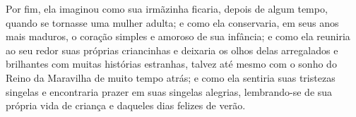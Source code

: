 Por fim, ela imaginou como sua irmãzinha ficaria, depois de algum tempo,
quando se tornasse uma mulher adulta; e como ela conservaria, em seus
anos mais maduros, o coração simples e amoroso de sua infância; e como
ela reuniria ao seu redor suas próprias criancinhas e deixaria os olhos
delas arregalados e brilhantes com muitas histórias estranhas, talvez
até mesmo com o sonho do Reino da Maravilha de muito tempo atrás; e como
ela sentiria suas tristezas singelas e encontraria prazer em suas
singelas alegrias, lembrando-se de sua própria vida de criança e
daqueles dias felizes de verão.

